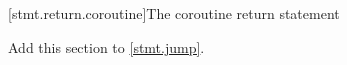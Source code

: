 %
%
%
%

[stmt.return.coroutine]{The coroutine return statement}%

Add this section to \ref{stmt.jump}.

